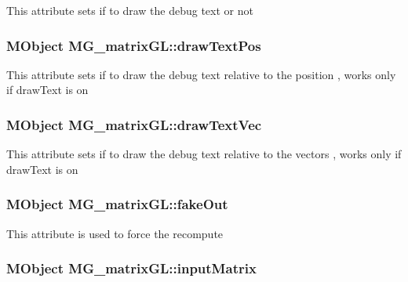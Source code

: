 This attribute sets if to draw the debug text or not \hypertarget{class_m_g__matrix_g_l_a480b4cbf60606b4cf9310d7daa2c3765}{
\subsubsection[{draw\-Text\-Pos}]{\setlength{\rightskip}{0pt plus 5cm}M\-Object M\-G\-\_\-matrix\-G\-L\-::draw\-Text\-Pos\hspace{0.3cm}{\ttfamily [static]}}}\label{class_m_g__matrix_g_l_a480b4cbf60606b4cf9310d7daa2c3765}
This attribute sets if to draw the debug text relative to the position , works only if draw\-Text is on \hypertarget{class_m_g__matrix_g_l_aebfa4a8cfd4b7e50f16d8687adc82750}{
\subsubsection[{draw\-Text\-Vec}]{\setlength{\rightskip}{0pt plus 5cm}M\-Object M\-G\-\_\-matrix\-G\-L\-::draw\-Text\-Vec\hspace{0.3cm}{\ttfamily [static]}}}\label{class_m_g__matrix_g_l_aebfa4a8cfd4b7e50f16d8687adc82750}
This attribute sets if to draw the debug text relative to the vectors , works only if draw\-Text is on \hypertarget{class_m_g__matrix_g_l_aa022ca409a739f2da5c80b29abd6f6dd}{
\subsubsection[{fake\-Out}]{\setlength{\rightskip}{0pt plus 5cm}M\-Object M\-G\-\_\-matrix\-G\-L\-::fake\-Out\hspace{0.3cm}{\ttfamily [static]}}}\label{class_m_g__matrix_g_l_aa022ca409a739f2da5c80b29abd6f6dd}
This attribute is used to force the recompute \hypertarget{class_m_g__matrix_g_l_af55678e43c32e023ed89249bc7c852cd}{
\subsubsection[{input\-Matrix}]{\setlength{\rightskip}{0pt plus 5cm}M\-Object M\-G\-\_\-matrix\-G\-L\-::input\-Matrix\hspace{0.3cm}{\ttfamily [static]}}}\label{class_m_g__matrix_g_l_af55678e43c32e023ed89249bc7c852cd}
